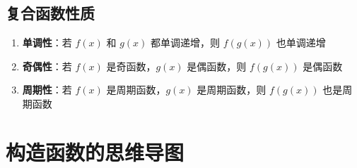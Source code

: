 \documentclass[a4paper,11pt]{ctexrep}
\theoremstyle{definition}
\begin{document}
\subsection{复合函数性质}

\begin{methodbox}[复合函数性质]
\begin{enumerate}
    \item \textbf{单调性}：若 $f(x)$ 和 $g(x)$ 都单调递增，则 $f(g(x))$ 也单调递增
    \item \textbf{奇偶性}：若 $f(x)$ 是奇函数，$g(x)$ 是偶函数，则 $f(g(x))$ 是偶函数
    \item \textbf{周期性}：若 $f(x)$ 是周期函数，$g(x)$ 是周期函数，则 $f(g(x))$ 也是周期函数
\end{enumerate}
\end{methodbox}

\section{构造函数的思维导图}
\end{document}
